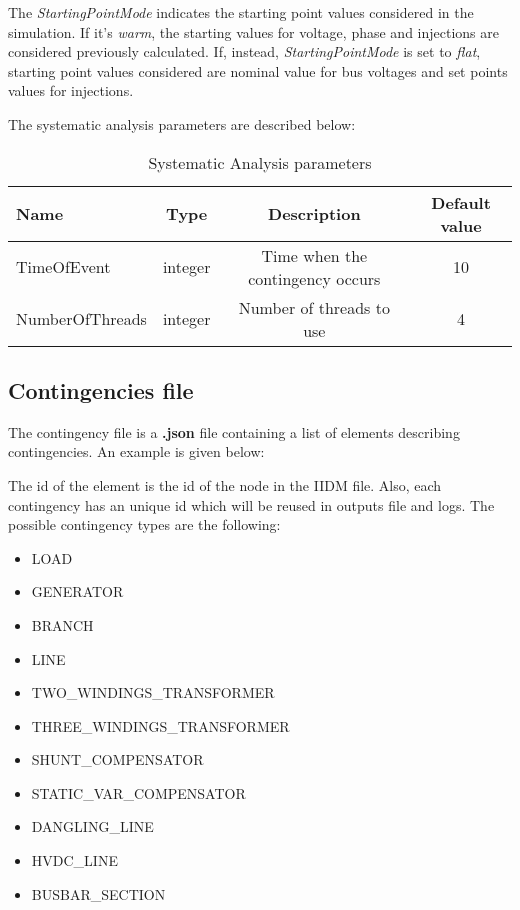 \documentclass[a4paper, 12pt]{report}
\begin{document}
The \textit{StartingPointMode} indicates the starting point values considered in the simulation. If it's \textit{warm}, the starting values for voltage, phase and injections are considered previously calculated.
If, instead, \textit{StartingPointMode} is set to \textit{flat}, starting point values considered are nominal value for bus voltages and set points values for injections.

\begin{table}[H]
The systematic analysis parameters are described below:
\center
\begin{tabular}{ l | c | c | c }
\toprule
\textbf{{Name}} & \textbf{{Type}} & \textbf{{Description}} & \textbf{{Default value}}\\
\midrule
\rowcolor{white}
TimeOfEvent & integer & Time when the contingency occurs & 10 \\
\rowcolor{gray!10}
NumberOfThreads & integer & Number of threads to use & 4 \\
\bottomrule
\end{tabular}
\caption{Systematic Analysis parameters}
\end{table}

\subsection{Contingencies file}

The contingency file is a \textbf{.json} file containing a list of elements describing contingencies. An example is given below:


The id of the element is the id of the node in the IIDM file.
Also, each contingency has an unique id which will be reused in outputs file and logs.
The possible contingency types are the following:
\begin{itemize}
  \item LOAD
  \item GENERATOR
  \item BRANCH
  \item LINE
  \item TWO\_WINDINGS\_TRANSFORMER
  \item THREE\_WINDINGS\_TRANSFORMER
  \item SHUNT\_COMPENSATOR
  \item STATIC\_VAR\_COMPENSATOR
  \item DANGLING\_LINE
  \item HVDC\_LINE
  \item BUSBAR\_SECTION
\end{itemize}
\end{document}
